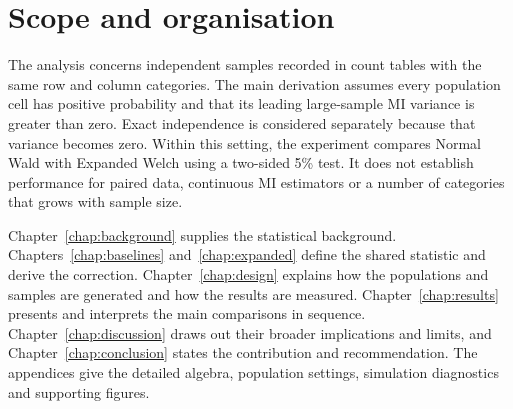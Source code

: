 \section{Scope and organisation}

The analysis concerns independent samples recorded in count tables with the
same row and column categories. The main derivation assumes every population
cell has positive probability and that its leading large-sample MI variance
is greater than zero. Exact independence is considered separately because
that variance becomes zero.
Within this setting, the experiment compares Normal Wald with Expanded Welch
using a two-sided 5\%
test. It does not establish performance for paired data, continuous MI
estimators or a number of categories that grows with sample size.

Chapter~\ref{chap:background} supplies the statistical background.
Chapters~\ref{chap:baselines} and~\ref{chap:expanded} define the shared
statistic and derive the correction. Chapter~\ref{chap:design} explains how
the populations and samples are generated and how the results are measured.
Chapter~\ref{chap:results} presents and interprets the main comparisons
in sequence. Chapter~\ref{chap:discussion} draws out their broader
implications and limits, and Chapter~\ref{chap:conclusion} states the
contribution and recommendation. The appendices give the detailed algebra,
population settings, simulation diagnostics and supporting figures.
